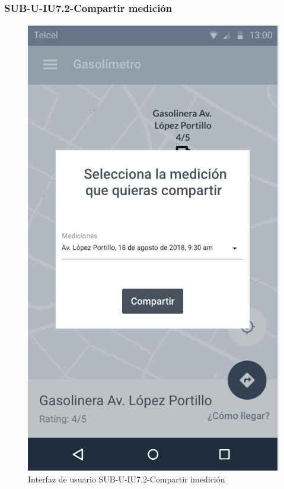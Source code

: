 \subsubsection{SUB-U-IU7.2-Compartir medición}\label{SUB-U-IU7.2}
\begin{figure}[H]
	\centering
	\includegraphics[scale=.55]{Capitulo4/software/submodulos/usuarios/images/sub-u-iu7_2}
	\caption{Interfaz de usuario SUB-U-IU7.2-Compartir imedición}
	\label{fig:sub-u-iu7.2}
\end{figure}